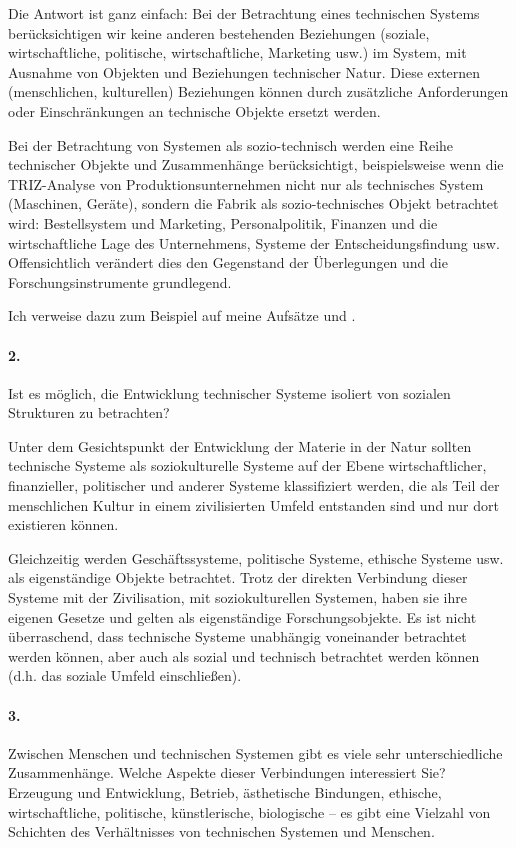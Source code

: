 \documentclass[11pt,a4paper]{article}
\begin{document}
Die Antwort ist ganz einfach: Bei der Betrachtung eines technischen Systems
berücksichtigen wir keine anderen bestehenden Beziehungen (soziale,
wirtschaftliche, politische, wirtschaftliche, Marketing usw.) im System, mit
Ausnahme von Objekten und Beziehungen technischer Natur. Diese externen
(menschlichen, kulturellen) Beziehungen können durch zusätzliche Anforderungen
oder Einschränkungen an technische Objekte ersetzt werden.

Bei der Betrachtung von Systemen als sozio-technisch werden eine Reihe
technischer Objekte und Zusammenhänge berücksichtigt, beispielsweise wenn die
TRIZ-Analyse von Produktionsunternehmen nicht nur als technisches System
(Maschinen, Geräte), sondern die Fabrik als sozio-technisches Objekt
betrachtet wird: Bestellsystem und Marketing, Personalpolitik, Finanzen und
die wirtschaftliche Lage des Unternehmens, Systeme der Entscheidungsfindung
usw. Offensichtlich verändert dies den Gegenstand der Überlegungen und die
Forschungsinstrumente grundlegend.

Ich verweise dazu zum Beispiel auf meine Aufsätze \cite{Rubin2007} und
\cite{Rubin2010}.

\paragraph{2.}
Ist es möglich, die Entwicklung technischer Systeme isoliert von sozialen
Strukturen zu betrachten?

Unter dem Gesichtspunkt der Entwicklung der Materie in der Natur sollten
technische Systeme als soziokulturelle Systeme auf der Ebene wirtschaftlicher,
finanzieller, politischer und anderer Systeme klassifiziert werden, die als
Teil der menschlichen Kultur in einem zivilisierten Umfeld entstanden sind
und nur dort existieren können.

Gleichzeitig werden Geschäftssysteme, politische Systeme, ethische Systeme
usw. als eigen\-ständige Objekte betrachtet. Trotz der direkten Verbindung
dieser Systeme mit der Zivilisation, mit soziokulturellen Systemen, haben sie
ihre eigenen Gesetze und gelten als eigenständige Forschungsobjekte. Es ist
nicht überraschend, dass technische Systeme unabhängig voneinander betrachtet
werden können, aber auch als sozial und technisch betrachtet werden können
(d.h. das soziale Umfeld einschließen).

\paragraph{3.}
Zwischen Menschen und technischen Systemen gibt es viele sehr unterschiedliche
Zusammenhänge. Welche Aspekte dieser Verbindungen interessiert Sie?  Erzeugung
und Entwicklung, Betrieb, ästhetische Bindungen, ethische, wirtschaftliche,
politische, künstlerische, biologische -- es gibt eine Vielzahl von Schichten
des Verhältnisses von technischen Systemen und Menschen.
\end{document}
